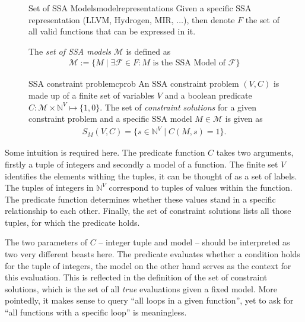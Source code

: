 \begin{figure}[H]
\begin{notation}{Set of SSA Models}{modelrepresentations}
    Given a specific SSA representation (LLVM, Hydrogen, MIR, $\dots$), then
    denote $F$ the set of all valid functions that can be expressed in it.

    The {\em set of SSA models} $\mathcal M$ is defined as
    \begin{align*}
        \mathcal M := \{M\mid\exists\mathcal F\in F\colon M
                        \text{ is the SSA Model of }\mathcal F\}
    \end{align*}
\end{notation}

\begin{definition}{SSA constraint problem}{cprob}
    An SSA constraint problem $(V,C)$ is made up of a finite set of variables
    $V$ and a boolean predicate
    $C\colon\mathcal M\times\mathbb N^V\mapsto\{1,0\}$.
    The set of {\em constraint solutions} for a given constraint problem and a
    specific SSA model $M\in\mathcal M$ is given as
    \begin{align*}
        S_M(V,C) = \{s\in\mathbb N^V\mid C(M,s)=1\}.
    \end{align*}
\end{definition}
\end{figure}

    Some intuition is required here.
    The predicate function $C$ takes two arguments, firstly a tuple of integers
    and secondly a model of a function.
    The finite set $V$ identifies the elements withing the tuples, it can be
    thought of as a set of labels.
    The tuples of integers in $\mathbb N^V$ correspond to tuples of values
    within the function.
    The predicate function determines whether these values stand in a specific
    relationship to each other.
    Finally, the set of constraint solutions lists all those tuples, for which
    the predicate holds.

    The two parameters of $C$ -- integer tuple and model -- should be
    interpreted as two very different beasts here.
    The predicate evaluates whether a condition holds for the tuple of integers,
    the model on the other hand serves as the context for this evaluation.
    This is reflected in the definition of the set of constraint solutions,
    which is the set of all {\em true} evaluations given a fixed model.
    More pointedly, it makes sense to query ``all loops in a given function'',
    yet to ask for ``all functions with a specific loop'' is meaningless.

